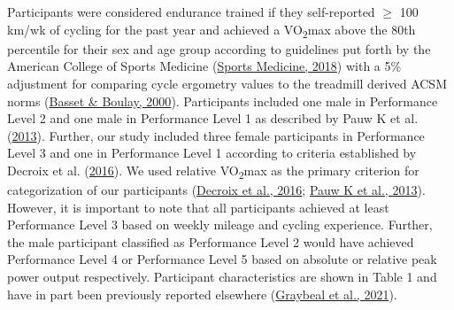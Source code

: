 \documentclass[]{cik}%
\begin{document}
Participants were considered endurance trained if they self-reported
\(\geq\) 100 km/wk of cycling for the past year and achieved a
VO\textsubscript{2}max above the 80th percentile for their sex and age
group according to guidelines put forth by the American College of
Sports Medicine (\protect\hyperlink{ref-33}{Sports Medicine, 2018}) with
a 5\% adjustment for comparing cycle ergometry values to the treadmill
derived ACSM norms (\protect\hyperlink{ref-34}{Basset \& Boulay, 2000}).
Participants included one male in Performance Level 2 and one male in
Performance Level 1 as described by Pauw K et al.
(\protect\hyperlink{ref-35}{2013}). Further, our study included three
female participants in Performance Level 3 and one in Performance Level
1 according to criteria established by Decroix et al.
(\protect\hyperlink{ref-36}{2016}). We used relative
VO\textsubscript{2}max as the primary criterion for categorization of
our participants (\protect\hyperlink{ref-36}{Decroix et al., 2016};
\protect\hyperlink{ref-35}{Pauw K et al., 2013}). However, it is
important to note that all participants achieved at least Performance
Level 3 based on weekly mileage and cycling experience. Further, the
male participant classified as Performance Level 2 would have achieved
Performance Level 4 or Performance Level 5 based on absolute or relative
peak power output respectively. Participant characteristics are shown in
Table 1 and have in part been previously reported elsewhere
(\protect\hyperlink{ref-37}{Graybeal et al., 2021}).
\end{document}
